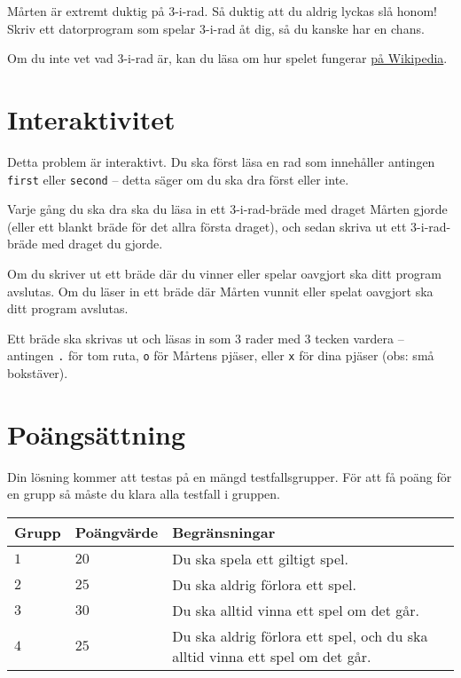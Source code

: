 Mårten är extremt duktig på 3-i-rad. Så duktig att du aldrig lyckas slå honom! Skriv ett datorprogram som spelar 3-i-rad åt dig, så du kanske har en chans.

Om du inte vet vad 3-i-rad är, kan du läsa om hur spelet fungerar \href{https://sv.wikipedia.org/wiki/Tre_i_rad}{på Wikipedia}.

\section*{Interaktivitet}
Detta problem är interaktivt. Du ska först läsa en rad som innehåller antingen \texttt{first} eller \texttt{second} -- detta säger om du ska dra först eller inte.

Varje gång du ska dra ska du läsa in ett 3-i-rad-bräde med draget Mårten gjorde
(eller ett blankt bräde för det allra första draget),
och sedan skriva ut ett 3-i-rad-bräde med draget du gjorde.

Om du skriver ut ett bräde där du vinner eller spelar oavgjort ska ditt program avslutas. Om du läser in ett bräde där Mårten vunnit eller spelat oavgjort ska ditt program avslutas.

Ett bräde ska skrivas ut och läsas in som 3 rader med 3 tecken vardera -- antingen \texttt{.} för tom ruta, \texttt{o} för Mårtens pjäser, eller \texttt{x} för dina pjäser (obs: små bokstäver).

\section*{Poängsättning}
Din lösning kommer att testas på en mängd testfallsgrupper. För att få poäng för en grupp så måste du klara alla testfall i gruppen.

\noindent
\begin{tabular}{| l | l | l |}
	\hline
	Grupp & Poängvärde & Begränsningar\\ \hline
 $1$    & $20$        & Du ska spela ett giltigt spel. \\ \hline
 $2$    & $25$        & Du ska aldrig förlora ett spel. \\ \hline
 $3$    & $30$        & Du ska alltid vinna ett spel om det går. \\ \hline
 $4$    & $25$        & Du ska aldrig förlora ett spel, och du ska alltid vinna ett spel om det går. \\ \hline
\end{tabular}
